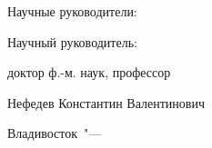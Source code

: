 %
\vspace{0pt plus4fill} %
\begin{flushright}
	\ifdefined\supervisorTwoFio
	Научные руководители:
	
	\supervisorRegalia
	
	\ifdefined\supervisorDead
	\framebox{\supervisorFio}
	\else
	\supervisorFio
	\fi
	
	\supervisorTwoRegalia
	
	\ifdefined\supervisorTwoDead
	\framebox{\supervisorTwoFio}
	\else
	\supervisorTwoFio
	\fi
	\else
	Научный руководитель:
	
	доктор ф.-м. наук, профессор
	
	\ifdefined\supervisorDead
	\framebox{\supervisorFio}
	\else
	Нефедев Константин Валентинович
	\fi
	\fi
	
\end{flushright}
%
\vspace{0pt plus4fill} %
{\centering Владивосток\ "--- \thesisYear\par}
